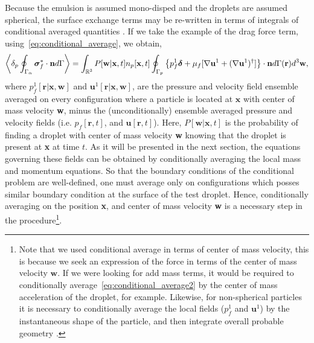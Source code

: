 Because the emulsion is assumed mono-disped and the droplets are assumed spherical, the surface exchange terms may be re-written in terms of integrals of conditional averaged quantities \citep{lhuillier1992ensemble,zhang1997momentum,fintzi2025}. 
If we take the example of the drag force term, using~\ref{eq:conditional_average}, we obtain, 
\begin{equation}
    \pSavg{\bm\sigma^*_f\cdot \textbf{n}}
    =
    \int_{\mathbb{R}^3} P[\textbf{w}|\textbf{x},t] n_p[\textbf{x},t]\intS[p]{
        \left\{
            p_f^1 \bm\delta 
    + \mu_f [\grad \textbf{u}^1 + (\grad \textbf{u}^1)^\dagger]
        \right\}\cdot \textbf{n}
    }(\textbf{r})  
    d^3 \textbf{w},
    \label{eq:conditional_average2}
\end{equation}
where $p_f^1[\textbf{r}|\textbf{x},\textbf{w}]$ and $\textbf{u}^1[\textbf{r}|\textbf{x},\textbf{w}]$, are the pressure and velocity field ensemble averaged on every configuration where a particle is located at $\textbf{x}$ with center of mass velocity \textbf{w}, minus the (unconditionally) ensemble averaged  pressure and velocity fields (i.e. $p_f[\textbf{r},t]$, and $\textbf{u}[\textbf{r},t]$).
Here, $ P[\textbf{w}|\textbf{x},t]$ is the probability of finding a droplet with center of mass velocity \textbf{w} knowing that the droplet is present at \textbf{x} at time $t$. 
As it will be presented in the next section, the equations governing these fields can be obtained by conditionally averaging the local mass and momentum equations.
So that the boundary conditions of the conditional problem are well-defined, one must average only on configurations which posses similar boundary condition at the surface of the test droplet. 
Hence, conditionally averaging on the position \textbf{x}, and center of mass velocity \textbf{w} is a necessary step in the procedure\footnote{
    Note that we used conditional average in terms of center of mass velocity, this is because we seek an expression of the force in terms of the center of mass velocity $\textbf{w}$. 
    If we were looking for add mass terms, it would be required to conditionally average~\ref{eq:conditional_average2} by the center of mass acceleration of the droplet, for example. 
    Likewise, for non-spherical particles it is necessary to conditionally average the local fields ($p_f^1$ and  $\textbf{u}^1$) by the instantaneous shape of the particle, and then integrate overall probable geometry \citep{lhuillier1992ensemble}. 
}.

